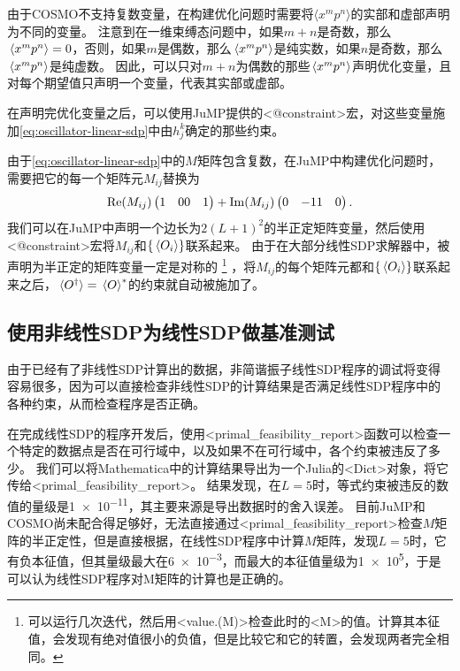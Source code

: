 \documentclass[oneside]{fduthesis}
\def\\{}%
\def\texttt#1{<#1>}%
\begin{document}
由于COSMO不支持复数变量，在构建优化问题时需要将$\langle x^m p^n \rangle$的实部和虚部声明为不同的变量。
注意到在一维束缚态问题中，如果$m+n$是奇数，那么$\expval*{x^m p^n} = 0$，否则，如果$m$是偶数，那么$\expval*{x^m p^n}$是纯实数，如果$n$是奇数，那么$\expval*{x^m p^n}$是纯虚数。
因此，可以只对$m+n$为偶数的那些$\expval*{x^m p^n}$声明优化变量，且对每个期望值只声明一个变量，代表其实部或虚部。

在声明完优化变量之后，可以使用JuMP提供的\texttt{@constraint}宏，对这些变量施加\eqref{eq:oscillator-linear-sdp}中由$h_j^k$确定的那些约束。

由于\eqref{eq:oscillator-linear-sdp}中的$M$矩阵包含复数，在JuMP中构建优化问题时，需要把它的每一个矩阵元$M_{ij}$替换为
\begin{equation}
    \Re(M_{ij}) \pmqty{1 & 0 \\ 0 & 1} + \Im(M_{ij}) \pmqty{0 & -1 \\ 1 & 0}.
    \label{eq:complex-to-real}
\end{equation}
我们可以在JuMP中声明一个边长为$2(L+1)^2$的半正定矩阵变量，然后使用\texttt{@constraint}宏将$M_{ij}$和$\{\expval*{O_i}\}$联系起来。
由于在大部分线性SDP求解器中，被声明为半正定的矩阵变量一定是对称的%
\footnote{可以运行几次迭代，然后用\texttt{value.(M)}检查此时的\texttt{M}的值。计算其本征值，会发现有绝对值很小的负值，但是比较它和它的转置，会发现两者完全相同。}%
，将$M_{ij}$的每个矩阵元都和$\{\expval*{O_i}\}$联系起来之后，$\expval*{O^\dagger} = \expval*{O}^*$的约束就自动被施加了。

\subsection{使用非线性SDP为线性SDP做基准测试}\label{sec:oscillator-benchmark}

由于已经有了非线性SDP计算出的数据，非简谐振子线性SDP程序的调试将变得容易很多，因为可以直接检查非线性SDP的计算结果是否满足线性SDP程序中的各种约束，从而检查程序是否正确。

在完成线性SDP的程序开发后，使用\texttt{primal\_feasibility\_report}函数可以检查一个特定的数据点是否在可行域中，以及如果不在可行域中，各个约束被违反了多少。
我们可以将Mathematica中的计算结果导出为一个Julia的\texttt{Dict}对象，将它传给\texttt{primal\_feasibility\_report}。
结果发现，在$L=5$时，等式约束被违反的数值的量级是\num{1e-11}，其主要来源是导出数据时的舍入误差。
目前JuMP和COSMO尚未配合得足够好，无法直接通过\texttt{primal\_feasibility\_report}检查$M$矩阵的半正定性，但是直接根据，在线性SDP程序中计算$M$矩阵，发现$L=5$时，它有负本征值，但其量级最大在\num{6e-3}，而最大的本征值量级为\num{1e5}，于是可以认为线性SDP程序对M矩阵的计算也是正确的。
\end{document}
